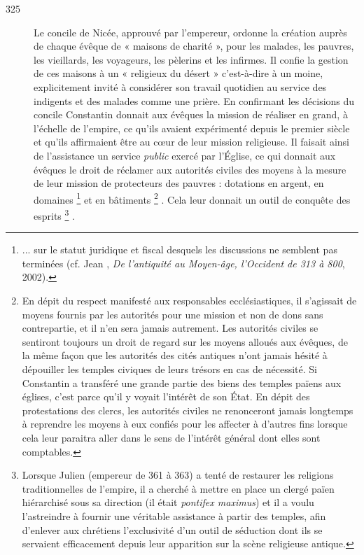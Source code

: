 \begin{description}
\item[325] Le concile de Nicée, approuvé par l'empereur, ordonne la création auprès de chaque évêque de « maisons de charité », pour les malades, les pauvres, les vieillards, les voyageurs, les pèlerins et les infirmes. Il confie la gestion de ces maisons à un « religieux du désert » c'est-à-dire à un moine, explicitement invité à considérer son travail quotidien au service des indigents et des malades comme une prière. En confirmant les décisions du concile Constantin donnait aux évêques la mission de réaliser en grand, à l'échelle de l'empire, ce qu'ils avaient expérimenté depuis le premier siècle et qu'ils affirmaient être au cœur de leur mission religieuse. Il faisait ainsi de l'assistance un service \emph{public} exercé par l'Église, ce qui donnait aux évêques le droit de réclamer aux autorités civiles des moyens à la mesure de leur mission de protecteurs des pauvres : dotations en argent, en domaines%
\footnote{... sur le statut juridique et fiscal desquels les discussions ne semblent pas terminées (cf. Jean , \emph{De l'antiquité au Moyen-âge, l'Occident de 313 à 800}, 2002).} 
et en bâtiments%
\footnote{En dépit du respect manifesté aux responsables ecclésiastiques, il s'agissait de moyens fournis par les autorités pour une mission et non de dons sans contrepartie, et il n'en sera jamais autrement. Les autorités civiles se sentiront toujours un droit de regard sur les moyens alloués aux évêques, de la même façon que les autorités des cités antiques n'ont jamais hésité à dépouiller les temples civiques de leurs trésors en cas de nécessité. Si Constantin a transféré une grande partie des biens des temples païens aux églises, c'est parce qu'il y voyait l'intérêt de son État. En dépit des protestations des clercs, les autorités civiles ne renonceront jamais longtemps à reprendre les moyens à eux confiés pour les affecter à d'autres fins lorsque cela leur paraitra aller dans le sens de l'intérêt général dont elles sont comptables.}%
. Cela leur donnait un outil de conquête des esprits%
\footnote{Lorsque Julien (empereur de 361 à 363) a tenté de restaurer les religions traditionnelles de l'empire, il a cherché à mettre en place un clergé païen hiérarchisé sous sa direction (il était \emph{pontifex maximus}) et il a voulu l'astreindre à fournir une véritable assistance à partir des temples, afin d'enlever aux chrétiens l'exclusivité d'un outil de séduction dont ils se servaient efficacement depuis leur apparition sur la scène religieuse antique.}%
. 


\end{description}
